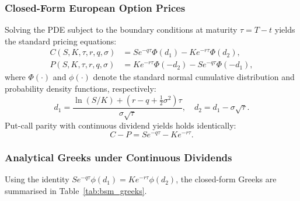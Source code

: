 \documentclass{article}
\theoremstyle{plain}
\theoremstyle{definition}
\theoremstyle{remark}
\begin{document}
\subsubsection{Closed-Form European Option Prices}
Solving the PDE subject to the boundary conditions at maturity $\tau = T - t$ yields the standard pricing equations:
\begin{align}
C(S, K, \tau, r, q, \sigma) &= S e^{-q\tau}\Phi(d_1) - K e^{-r\tau}\Phi(d_2), \\
P(S, K, \tau, r, q, \sigma) &= K e^{-r\tau}\Phi(-d_2) - S e^{-q\tau}\Phi(-d_1),
\end{align}
where $\Phi(\cdot)$ and $\phi(\cdot)$ denote the standard normal cumulative distribution and probability density functions, respectively:
\begin{equation}
d_1 = \frac{\ln(S/K) + \left(r - q + \frac{1}{2}\sigma^2\right)\tau}{\sigma\sqrt{\tau}}, \quad d_2 = d_1 - \sigma\sqrt{\tau}.
\end{equation}
Put-call parity with continuous dividend yields holds identically:
\begin{equation}
C - P = S e^{-q\tau} - K e^{-r\tau}.
\end{equation}

\subsubsection{Analytical Greeks under Continuous Dividends}
Using the identity $S e^{-q\tau}\phi(d_1) = K e^{-r\tau}\phi(d_2)$, the closed-form Greeks are summarised in Table~\ref{tab:bsm_greeks}.
\end{document}
